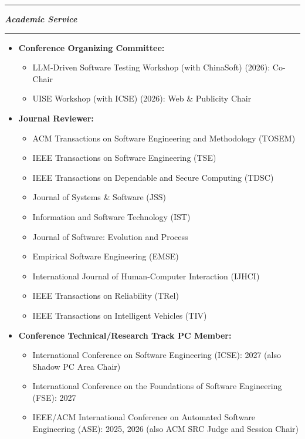 \documentclass[12pt,a4paper]{article}
\newcommand{\cvsection}[1]{%
  \par\vspace{5pt}%
  \noindent\begin{minipage}{\linewidth}%
    \rule{\linewidth}{1.3pt}\par%
    \parbox[c][31pt][c]{\linewidth}{%
      \fontsize{20}{22}\selectfont\bfseries\itshape #1%
    }\par%
    \rule{\linewidth}{1.3pt}%
  \end{minipage}\par\nobreak\vspace{4pt}\nobreak%
}
\begin{document}
\cvsection{Academic Service}
\begin{itemize}[leftmargin=1.25em,label=\textbullet,topsep=0pt,itemsep=1pt,parsep=0pt]
  \item \textbf{Conference Organizing Committee:}
    \begin{itemize}[leftmargin=1.25em,label=\textbullet,topsep=1pt,itemsep=1pt,parsep=0pt]
      \item LLM-Driven Software Testing Workshop (with ChinaSoft) (2026): Co-Chair
      \item UISE Workshop (with ICSE) (2026): Web \& Publicity Chair
    \end{itemize}
  \item \textbf{Journal Reviewer:}
    \begin{itemize}[leftmargin=1.25em,label=\textbullet,topsep=1pt,itemsep=1pt,parsep=0pt]
      \item ACM Transactions on Software Engineering and Methodology (TOSEM)
      \item IEEE Transactions on Software Engineering (TSE)
      \item IEEE Transactions on Dependable and Secure Computing (TDSC)
      \item Journal of Systems \& Software (JSS)
      \item Information and Software Technology (IST)
      \item Journal of Software: Evolution and Process
      \item Empirical Software Engineering (EMSE)
      \item International Journal of Human-Computer Interaction (IJHCI)
      \item IEEE Transactions on Reliability (TRel)
      \item IEEE Transactions on Intelligent Vehicles (TIV)
    \end{itemize}
  \item \textbf{Conference Technical/Research Track PC Member:}
    \begin{itemize}[leftmargin=1.25em,label=\textbullet,topsep=1pt,itemsep=1pt,parsep=0pt]
      \item International Conference on Software Engineering (ICSE): 2027 (also Shadow PC Area Chair)
      \item International Conference on the Foundations of Software Engineering (FSE): 2027
      \item IEEE/ACM International Conference on Automated Software Engineering (ASE): 2025, 2026 (also ACM SRC Judge and Session Chair)

\end{itemize}
\end{itemize}
\end{document}
